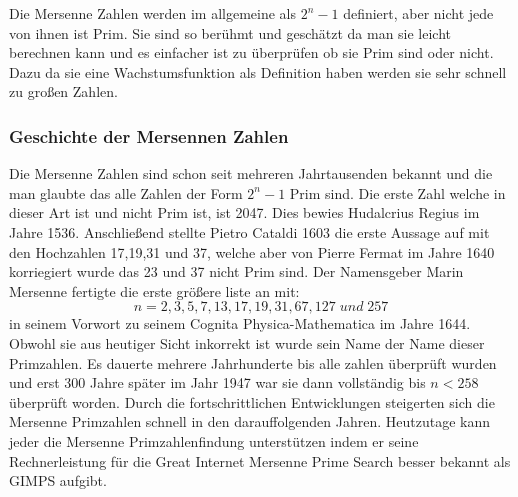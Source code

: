 Die Mersenne Zahlen werden im allgemeine als $2^{n}-1 $ definiert, aber nicht jede von ihnen ist Prim. Sie sind so berühmt und geschätzt da man sie leicht berechnen kann und es einfacher ist zu überprüfen ob sie Prim sind oder nicht. Dazu da sie eine Wachstumsfunktion als Definition haben werden sie sehr schnell zu großen Zahlen.
\subsubsection{Geschichte der Mersennen Zahlen}
Die Mersenne Zahlen sind schon seit mehreren Jahrtausenden bekannt und die man glaubte das alle Zahlen der Form $2^{n}-1$ Prim sind. Die erste Zahl welche in dieser Art ist und nicht Prim ist, ist 2047. Dies bewies Hudalcrius Regius im Jahre 1536. Anschließend stellte Pietro Cataldi 1603 die erste Aussage auf mit den Hochzahlen 17,19,31 und 37, welche aber von Pierre Fermat im Jahre 1640 korriegiert wurde das 23 und 37 nicht Prim sind. Der Namensgeber Marin Mersenne fertigte die erste größere liste an mit: 
\[n=2,3,5,7,13,17,19,31,67,127\; und\; 257\]
in seinem Vorwort zu seinem Cognita Physica-Mathematica im Jahre 1644.
Obwohl sie aus heutiger Sicht inkorrekt ist wurde sein Name der Name dieser Primzahlen. Es dauerte mehrere Jahrhunderte bis alle zahlen überprüft wurden und erst 300 Jahre später im Jahr 1947 war sie dann vollständig bis $n<258$ überprüft worden. Durch die fortschrittlichen Entwicklungen steigerten sich die Mersenne Primzahlen schnell in den darauffolgenden Jahren. Heutzutage kann jeder die Mersenne Primzahlenfindung unterstützen indem er seine Rechnerleistung für die Great Internet Mersenne Prime Search besser bekannt als GIMPS aufgibt.